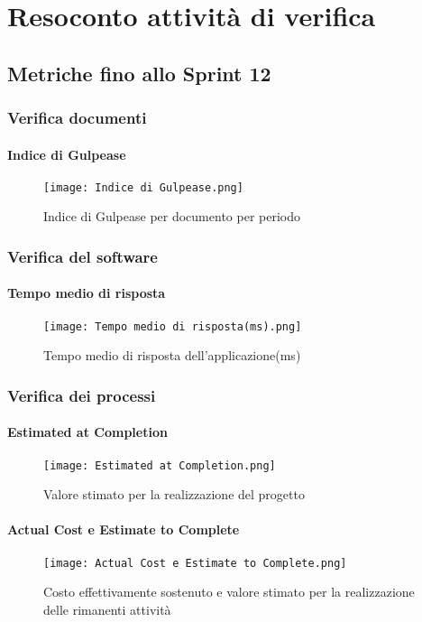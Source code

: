 \chapter{Resoconto attività di verifica}

\section{Metriche fino allo Sprint 12}

  \subsection{Verifica documenti}
    \subsubsection{Indice di Gulpease}
    \begin{figure}[H]
      \centering
      \texttt{[image: Indice di Gulpease.png]}
      \caption{Indice di Gulpease per documento per periodo}
    \end{figure}

  \subsection{Verifica del software}
    \subsubsection{Tempo medio di risposta}
    \begin{figure}[H]
      \centering
      \texttt{[image: Tempo medio di risposta(ms).png]}
      \caption{Tempo medio di risposta dell'applicazione(ms)}
    \end{figure}


  \subsection{Verifica dei processi}
    \subsubsection{Estimated at Completion}
    \begin{figure}[H]
      \centering
      \texttt{[image: Estimated at Completion.png]}
      \caption{Valore stimato per la realizzazione del progetto}
    \end{figure}

    \subsubsection{Actual Cost e Estimate to Complete}
    \begin{figure}[H]
      \centering
      \texttt{[image: Actual Cost e Estimate to Complete.png]}
      \caption{Costo effettivamente sostenuto e valore stimato per la realizzazione delle rimanenti attività}
    \end{figure}

